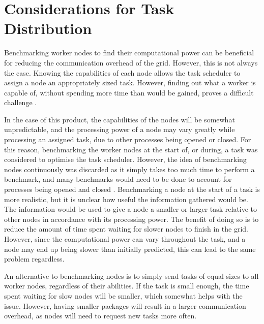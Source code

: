 \section{Considerations for Task Distribution} \label{sec:benchmarking}

Benchmarking worker nodes to find their computational power can be beneficial for reducing the communication overhead of the grid. However, this is not always the case. Knowing the capabilities of each node allows the task scheduler to assign a node an appropriately sized task. However, finding out what a worker is capable of, without spending more time than would be gained, proves a difficult challenge \cite{Charpentier_2017}.

In the case of this product, the capabilities of the nodes will be somewhat unpredictable, and the processing power of a node may vary greatly while processing an assigned task, due to other processes being opened or closed. For this reason, benchmarking the worker nodes at the start of, or during, a task was considered to optimise the task scheduler. However, the idea of benchmarking nodes continuously was discarded as it simply takes too much time to perform a benchmark, and many benchmarks would need to be done to account for processes being opened and closed \cite{Charpentier_2017}.
Benchmarking a node at the start of a task is more realistic, but it is unclear how useful the information gathered would be. The information would be used to give a node a smaller or larger task relative to other nodes in accordance with its processing power. The benefit of doing so is to reduce the amount of time spent waiting for slower nodes to finish in the grid. However, since the computational power can vary throughout the task, and a node may end up being slower than initially predicted, this can lead to the same problem regardless. \cite{Mengistu2019}

An alternative to benchmarking nodes is to simply send tasks of equal sizes to all worker nodes, regardless of their abilities. If the task is small enough, the time spent waiting for slow nodes will be smaller, which somewhat helps with the issue. However, having smaller packages will result in a larger communication overhead, as nodes will need to request new tasks more often. 